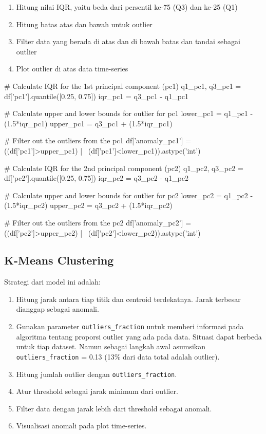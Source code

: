     \begin{enumerate}
        \item Hitung nilai IQR, yaitu beda dari persentil ke-75 (Q3) dan ke-25 (Q1)
        \item Hitung batas atas dan bawah untuk outlier
        \item Filter data yang berada di atas dan di bawah batas dan tandai sebagai outlier
        \item Plot outlier di atas data time-series
    \end{enumerate}

\begin{python}
# Calculate IQR for the 1st principal component (pc1)
q1_pc1, q3_pc1 = df['pc1'].quantile([0.25, 0.75])
iqr_pc1 = q3_pc1 - q1_pc1

# Calculate upper and lower bounds for outlier for pc1
lower_pc1 = q1_pc1 - (1.5*iqr_pc1)
upper_pc1 = q3_pc1 + (1.5*iqr_pc1)

# Filter out the outliers from the pc1
df['anomaly_pc1'] = ((df['pc1']>upper_pc1) | \
    (df['pc1']<lower_pc1)).astype('int')

# Calculate IQR for the 2nd principal component (pc2)
q1_pc2, q3_pc2 = df['pc2'].quantile([0.25, 0.75])
iqr_pc2 = q3_pc2 - q1_pc2

# Calculate upper and lower bounds for outlier for pc2
lower_pc2 = q1_pc2 - (1.5*iqr_pc2)
upper_pc2 = q3_pc2 + (1.5*iqr_pc2)

# Filter out the outliers from the pc2
df['anomaly_pc2'] = ((df['pc2']>upper_pc2) | \
    (df['pc2']<lower_pc2)).astype('int')
\end{python}

    \subsection{K-Means Clustering}

    Strategi dari model ini adalah:

    \begin{enumerate}
        \item Hitung jarak antara tiap titik dan centroid terdekatnya. Jarak terbesar dianggap sebagai anomali.
        \item Gunakan parameter \texttt{outliers\_fraction} untuk memberi informasi pada algoritma tentang proporsi outlier yang ada pada data. Situasi dapat berbeda untuk tiap dataset. Namun sebagai langkah awal asumsikan \texttt{outliers\_fraction} = 0.13 (13\% dari data total adalah outlier).
        \item Hitung jumlah outlier dengan \texttt{outliers\_fraction}.
        \item Atur threshold sebagai jarak minimum dari outlier.
        \item Filter data dengan jarak lebih dari threshold sebagai anomali.
        \item Visualisasi anomali pada plot time-series.
    \end{enumerate}

